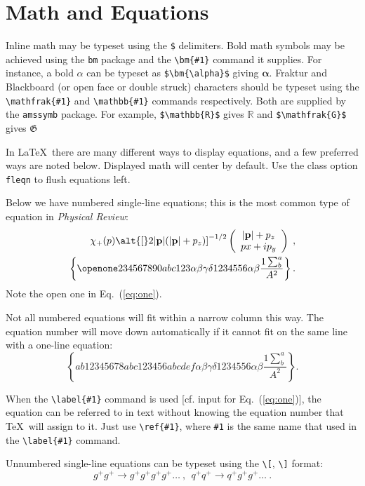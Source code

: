\documentclass[%
 preprint, linenumbers,
 amsmath,amssymb,
 aps, physrev,
]{revtex4-2}
\begin{document}
\section{Math and Equations}
Inline math may be typeset using the \verb+$+ delimiters. Bold math
symbols may be achieved using the \verb+bm+ package and the
\verb+\bm{#1}+ command it supplies. For instance, a bold $\alpha$ can
be typeset as \verb+$\bm{\alpha}$+ giving $\bm{\alpha}$. Fraktur and
Blackboard (or open face or double struck) characters should be
typeset using the \verb+\mathfrak{#1}+ and \verb+\mathbb{#1}+ commands
respectively. Both are supplied by the \texttt{amssymb} package. For
example, \verb+$\mathbb{R}$+ gives $\mathbb{R}$ and
\verb+$\mathfrak{G}$+ gives $\mathfrak{G}$

In \LaTeX\ there are many different ways to display equations, and a
few preferred ways are noted below. Displayed math will center by
default. Use the class option \verb+fleqn+ to flush equations left.

Below we have numbered single-line equations; this is the most common
type of equation in \textit{Physical Review}:
\begin{eqnarray}
\chi_+(p)\alt{\bf [}2|{\bf p}|(|{\bf p}|+p_z){\bf ]}^{-1/2}
\left(
\begin{array}{c}
|{\bf p}|+p_z\\
px+ip_y
\end{array}\right)\;,
\\
\left\{%
 \openone234567890abc123\alpha\beta\gamma\delta1234556\alpha\beta
 \frac{1\sum^{a}_{b}}{A^2}%
\right\}%
\label{eq:one}.
\end{eqnarray}
Note the open one in Eq.~(\ref{eq:one}).

Not all numbered equations will fit within a narrow column this
way. The equation number will move down automatically if it cannot fit
on the same line with a one-line equation:
\begin{equation}
\left\{
 ab12345678abc123456abcdef\alpha\beta\gamma\delta1234556\alpha\beta
 \frac{1\sum^{a}_{b}}{A^2}%
\right\}.
\end{equation}

When the \verb+\label{#1}+ command is used [cf. input for
Eq.~(\ref{eq:one})], the equation can be referred to in text without
knowing the equation number that \TeX\ will assign to it. Just
use \verb+\ref{#1}+, where \verb+#1+ is the same name that used in
the \verb+\label{#1}+ command.

Unnumbered single-line equations can be typeset
using the \verb+\[+, \verb+\]+ format:
\[g^+g^+ \rightarrow g^+g^+g^+g^+ \dots ~,~~q^+q^+\rightarrow
q^+g^+g^+ \dots ~. \]
\end{document}
